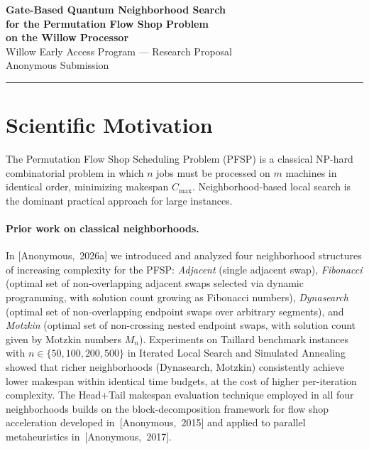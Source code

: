 \documentclass[11pt,a4paper]{article}
\newcommand{\anonA}{[Anonymous,~2026a]}
\newcommand{\anonC}{[Anonymous,~2015]}
\newcommand{\anonD}{[Anonymous,~2017]}
\begin{document}
\begin{center}
  {\LARGE\bfseries Gate-Based Quantum Neighborhood Search\\[4pt]
  for the Permutation Flow Shop Problem\\[6pt]
  on the Willow Processor}\\[12pt]
  {\large Willow Early Access Program --- Research Proposal}\\[4pt]
  {\normalsize Anonymous Submission}
\end{center}

\bigskip\hrule\bigskip

\section*{Scientific Motivation}

The Permutation Flow Shop Scheduling Problem (PFSP) is a classical NP-hard
combinatorial problem in which $n$ jobs must be processed on $m$ machines
in identical order, minimizing makespan $C_{\max}$. Neighborhood-based
local search is the dominant practical approach for large instances.

\paragraph{Prior work on classical neighborhoods.}
In \anonA{} we introduced and analyzed four neighborhood structures of
increasing complexity for the PFSP: \emph{Adjacent} (single adjacent
swap), \emph{Fibonacci} (optimal set of non-overlapping adjacent swaps
selected via dynamic programming, with solution count growing as Fibonacci
numbers), \emph{Dynasearch} (optimal set of non-overlapping endpoint swaps
over arbitrary segments), and \emph{Motzkin} (optimal set of non-crossing
nested endpoint swaps, with solution count given by Motzkin numbers $M_n$).
Experiments on Taillard benchmark instances with $n \in \{50,100,200,500\}$
in Iterated Local Search and Simulated Annealing showed that richer
neighborhoods (Dynasearch, Motzkin) consistently achieve lower makespan
within identical time budgets, at the cost of higher per-iteration
complexity.
The Head+Tail makespan evaluation technique employed in all four
neighborhoods builds on the block-decomposition framework for flow
shop acceleration developed in~\anonC{} and applied to parallel
metaheuristics in~\anonD{}.
\end{document}
